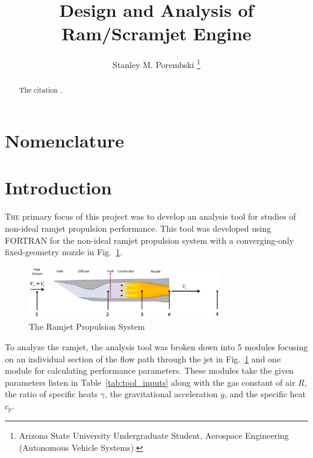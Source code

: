 \documentclass[conf]{new-aiaa} %
\title{Design and Analysis of Ram/Scramjet Engine}
\author{Stanley M. Porembski \footnote{Arizona State University Undergraduate Student, Aerospace Engineering (Autonomous Vehicle Systems).}}
\affil{Arizona State University Ira A. Schools of Engineering, Tempe, AZ, 85281}
\begin{document}
\maketitle

\begin{abstract}
The citation \cite{porembski2024github}.
\end{abstract}


\section*{Nomenclature}



\section{Introduction} \label{sec:introduction}
\lettrine{T}{he} primary focus of this project was to develop an analysis tool for studies of non-ideal ramjet propulsion performance. This tool was developed using FORTRAN for the non-ideal ramjet propulsion system with a converging-only fixed-geometry nozzle in Fig.~\ref{fig:propsys}.

\begin{figure}[hbt!] %
    \centering
    \includegraphics[width=0.75\textwidth]{media/the_ramjet.png}
    \caption{\label{fig:propsys} The Ramjet Propulsion System}
\end{figure}

To analyze the ramjet, the analysis tool was broken down into 5 modules focusing on an individual section of the flow path through the jet in Fig.~\ref{fig:propsys} and one module for calculating performance parameters. These modules take the given parameters listen in Table~\ref{tab:tool_inputs} along with the gas constant of air $R$, the ratio of specific heats $\gamma$, the gravitational acceleration $g$, and the specific heat $c_p$.
\end{document}
